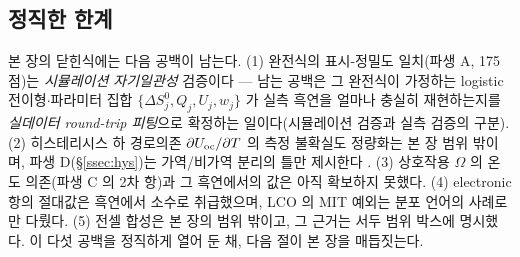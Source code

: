 \subsection{정직한 한계}\label{ssec:gaps}
본 장의 닫힌식에는 다음 공백이 남는다. (1) 완전식의 표시-정밀도 일치(파생 A, 175 점)는 \emph{시뮬레이션
자기일관성} 검증이다 --- 남는 공백은 그 완전식이 가정하는 logistic 전이형$\cdot$파라미터 집합
$\{\Delta S^0_j,Q_j,U_j,w_j\}$ 가 실측 흑연을 얼마나 충실히 재현하는지를 \emph{실데이터 round-trip 피팅}으로
확정하는 일이다(시뮬레이션 검증과 실측 검증의 구분). (2) 히스테리시스 하 경로의존 $\partial U_{\mathrm{oc}}/\partial T$ 의
측정 불확실도 정량화는 본 장 범위 밖이며, 파생 D(\S\ref{ssec:hys})는 가역/비가역 분리의 틀만 제시한다
\cite{hysteresis2018}. (3) 상호작용 $\Omega$ 의 온도 의존(파생 C 의 2차 항)과 그 흑연에서의 값은 아직
확보하지 못했다. (4) electronic 항의 절대값은 흑연에서 소수로 취급했으며, LCO 의 MIT 예외는 분포 언어의
사례로만 다뤘다. (5) 전셀 합성은 본 장의 범위 밖이고, 그 근거는 서두 범위 박스에 명시했다. 이 다섯 공백을
정직하게 열어 둔 채, 다음 절이 본 장을 매듭짓는다.

